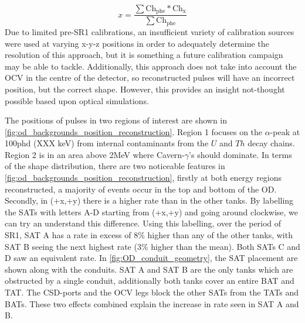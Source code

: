 \begin{equation}
    x = \frac{\sum{\text{Ch}_{\text{phe}} * \text{Ch}_\text{x}}}{\sum{\text{Ch}_\text{phe}}} 
\label{eq:OD_xy_position}
\end{equation}
Due to limited pre-SR1 calibrations, an insufficient variety of calibration sources were used at varying x-y-z positions in order to adequately determine the resolution of this approach, but it is something a future calibration campaign may be able to tackle. 
Additionally, this approach does not take into account the OCV in the centre of the detector, so reconstructed pulses will have an incorrect position, but the correct shape.
However, this provides an insight not-thought possible based upon optical simulations.




\par
The positions of pulses in two regions of interest are shown in \autoref{fig:od_backgrounds_position_reconstruction}.
Region 1 focuses on the $\alpha$-peak at 100phd (XXX keV) from internal contaminants from the $U$ and $Th$ decay chains.
Region 2 is in an area above 2MeV where Cavern-$\gamma$'s should dominate.
In terms of the shape distribution, there are two noticeable features in \autoref{fig:od_backgrounds_position_reconstruction}, firstly at both energy regions reconstructed, a majority of events occur in the top and bottom of the OD. 
Secondly, in (+x,+y) there is a higher rate than in the other tanks.
By labelling the SATs with letters A-D starting from (+x,+y) and going around clockwise, we can try an understand this difference.
Using this labelling, over the period of SR1, SAT A has a rate in excess of 8\% higher than any of the other tanks, with SAT B seeing the next highest rate (3\% higher than the mean).
Both SATs C and D saw an equivalent rate.
In \autoref{fig:OD_conduit_geometry}, the SAT placement are shown along with the conduits.
SAT A and SAT B are the only tanks which are obstructed by a single conduit, additionally both tanks cover an entire BAT and TAT. 
The CSD-ports and the OCV legs block the other SATs from the TATs and BATs.
These two effects combined explain the increase in rate seen in SAT A and B.



